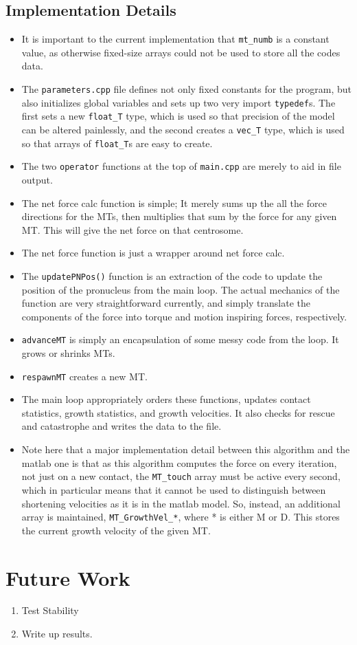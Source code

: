 \documentclass{article}
\begin{document}
\subsection{Implementation Details}
\begin{itemize}
  \item It is important to the current implementation that \texttt{mt\_numb} is
    a constant value, as otherwise fixed-size arrays could not be used to store
    all the codes data. 
  \item The \texttt{parameters.cpp} file defines not only fixed constants for
    the program, but also initializes global variables and sets up two very
    import \texttt{typedef}s. The first sets a new \texttt{float\_T} type, which
    is used so that precision of the model can be altered painlessly, and the
    second creates a \texttt{vec\_T} type, which is used so that arrays of
    \texttt{float\_T}s are easy to create. 
  \item The two \texttt{operator} functions at the top of \texttt{main.cpp} are
    merely to aid in file output. 
  \item The net force calc function is simple; It merely sums up the all the force
    directions for the MTs, then multiplies that sum by the force for any given
    MT. This will give the net force on that centrosome. 
  \item The net force function is just a wrapper around net force calc. 
  \item The \texttt{updatePNPos()} function is an extraction of the code to
    update the position of the pronucleus from the main loop. The
    actual mechanics of the function are very straightforward currently, and
    simply translate the components of the force into torque and motion
    inspiring forces, respectively. 
  \item \texttt{advanceMT} is simply an encapsulation of some messy code from
    the loop. It grows or shrinks MTs. 
  \item \texttt{respawnMT} creates a new MT. 
  \item The main loop appropriately orders these functions, updates contact
    statistics, growth statistics, and growth velocities. It also checks for
    rescue and catastrophe and writes the data to the file. 
  \item Note here that a major implementation detail between this algorithm and
    the matlab one is that as this algorithm computes the force on every
    iteration, not just on a new contact, the \texttt{MT\_touch} array must be
    active every second, which in particular means that it cannot be used to
    distinguish between shortening velocities as it is in the matlab model. So,
    instead, an additional array is maintained, \texttt{MT\_GrowthVel\_*}, where
    * is either M or D. This stores the current growth velocity of the given MT. 
\end{itemize}
\section{Future Work}
\begin{enumerate}
  \item Test Stability\\
  \item Write up results. 
\end{enumerate}
\end{document}
